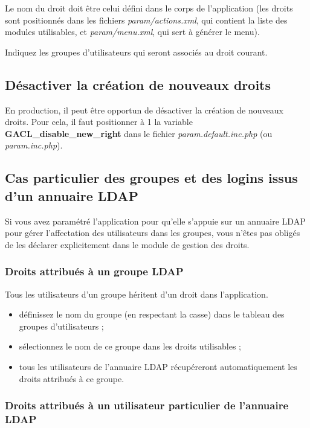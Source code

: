 Le nom du droit doit être celui défini dans le corps de l'application (les droits sont positionnés dans les fichiers \textit{param/actions.xml}, qui contient la liste des modules utilisables, et \textit{param/menu.xml}, qui sert à générer le menu).

Indiquez les groupes d'utilisateurs qui seront associés au droit courant.

\subsection{Désactiver la création de nouveaux droits}

En production, il peut être opportun de désactiver la création de nouveaux droits. Pour cela, il faut positionner à 1 la variable \textbf{GACL\_disable\_new\_right} dans le fichier \textit{param.default.inc.php} (ou \textit{param.inc.php}).

\subsection{Cas particulier des groupes et des logins issus d'un annuaire LDAP}

Si vous avez paramétré l'application pour qu'elle s'appuie sur un annuaire LDAP pour gérer l'affectation des utilisateurs dans les groupes, vous n'êtes pas obligés de les déclarer explicitement dans le module de gestion des droits.

\subsubsection{Droits attribués à un groupe LDAP}

Tous les utilisateurs d'un groupe héritent d'un droit dans l'application.

\begin{itemize}
\item définissez le nom du groupe (en respectant la casse) dans le tableau des groupes d'utilisateurs ;
\item sélectionnez le nom de ce groupe dans les droits utilisables ;
\item tous les utilisateurs de l'annuaire LDAP récupéreront automatiquement les droits attribués à ce groupe.
\end{itemize}

\subsubsection{Droits attribués à un utilisateur particulier de l'annuaire LDAP}


